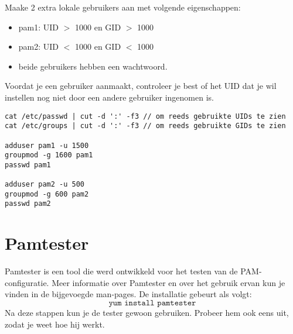 \documentclass{report}
\begin{document}
Maake 2 extra lokale gebruikers aan met volgende eigenschappen:
\begin{itemize}
	\item pam1: UID $>$ 1000 en GID $>$ 1000
	\item pam2: UID $<$ 1000 en GID $<$ 1000
	\item beide gebruikers hebben een wachtwoord.
\end{itemize}
Voordat je een gebruiker aanmaakt, controleer je best of het UID dat je wil instellen nog niet door een andere gebruiker ingenomen is. 
\begin{lstlisting}
cat /etc/passwd | cut -d ':' -f3 // om reeds gebruikte UIDs te zien
cat /etc/groups | cut -d ':' -f3 // om reeds gebruikte GIDs te zien

adduser pam1 -u 1500
groupmod -g 1600 pam1 
passwd pam1

adduser pam2 -u 500
groupmod -g 600 pam2 
passwd pam2
\end{lstlisting}

\section{Pamtester}
Pamtester is een tool die werd ontwikkeld voor het testen van de PAM-configuratie. Meer informatie over Pamtester en over het gebruik ervan kun je vinden in de bijgevoegde man-pages. De installatie gebeurt als volgt:
$$\texttt{yum install pamtester}$$
Na deze stappen kun je de tester gewoon gebruiken. Probeer hem ook eens uit, zodat je weet hoe hij werkt. 
\end{document}
